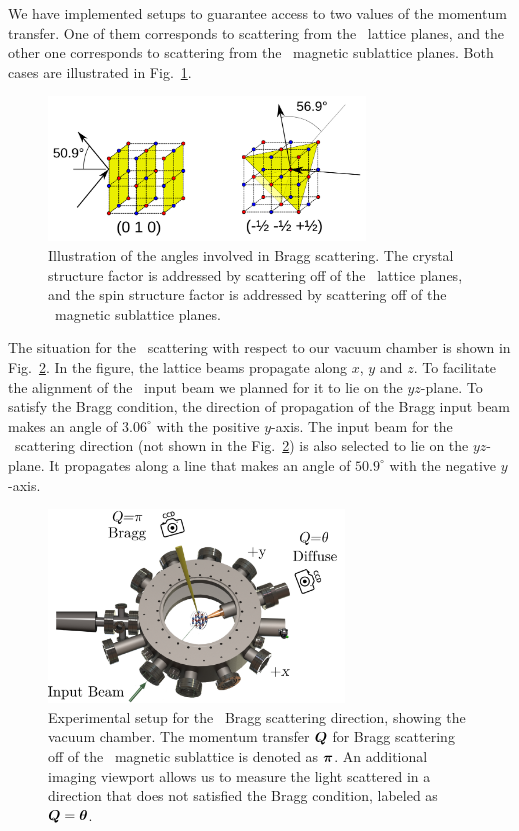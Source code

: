We have implemented setups to guarantee access to two values of the momentum
transfer. One of them corresponds to scattering from the \zoz\ lattice planes,
and the other one corresponds to scattering from the \hhh\ magnetic sublattice
planes.   Both cases are illustrated in
Fig.~\ref{fig:bragg_crystal_spin_angles}.
\begin{figure}
    \centering
\includegraphics[width=0.75\textwidth]{../figures/braggscatt/bragg_crystal_spin_angles.png}
\caption{\small  Illustration of the angles involved in Bragg scattering.  The
crystal structure factor is addressed by scattering off of the \zoz\ lattice
planes, and the spin structure factor is addressed by scattering off of the
\hhh\ magnetic sublattice planes. }
\label{fig:bragg_crystal_spin_angles}
\end{figure}
The situation for the \hhh\ scattering with respect to our vacuum chamber is
shown in Fig.~\ref{fig:bragg_hhh_chamber}.   In the figure, the lattice beams
propagate along $x$, $y$ and $z$.  To facilitate the alignment of the \hhh\
input beam we planned for it to lie on the $yz$-plane.  To satisfy the Bragg
condition, the direction of propagation of the Bragg input beam makes an angle
of $3.06^{\circ}$ with the positive $y$-axis.  The input beam for the \zoz\
scattering direction (not shown in the Fig.~\ref{fig:bragg_hhh_chamber}) is
also selected to lie on the $yz$-plane.  It propagates along a line that makes
an angle of $50.9^{\circ}$ with the negative $y$-axis. 
\begin{figure}
    \centering
\includegraphics[width=0.7\textwidth]{../figures/braggscatt/bragg_hhh_setup_chamber.png}
\caption{\small  Experimental setup for the \hhh\ Bragg scattering direction,
showing the vacuum chamber.  The momentum transfer $\bm{Q}$ for Bragg scattering
off of the \hhh\ magnetic sublattice is denoted as $\bm{\pi}$.  An additional
imaging viewport allows us to measure the light scattered in a direction that
does not satisfied the Bragg condition, labeled as $\bm{Q}=\bm{\theta}$. }
\label{fig:bragg_hhh_chamber}
\end{figure}

